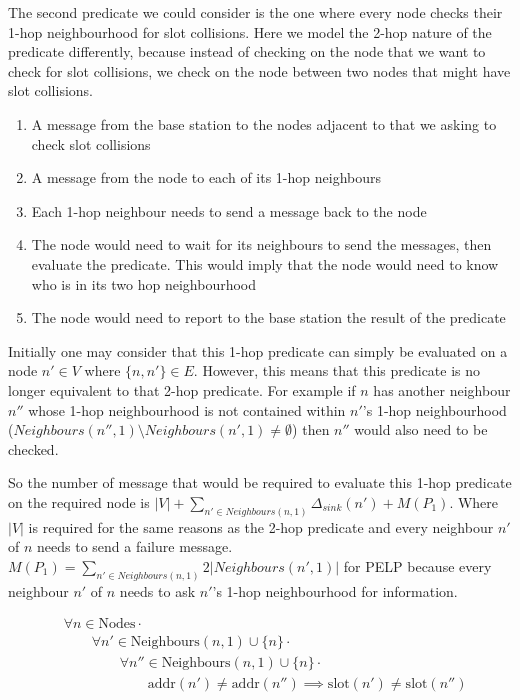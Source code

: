 The second predicate we could consider is the one where every node checks their 1-hop neighbourhood for slot collisions. Here we model the 2-hop nature of the predicate differently, because instead of checking on the node that we want to check for slot collisions, we check on the node between two nodes that might have slot collisions.

\begin{enumerate}
	\item A message from the base station to the nodes adjacent to that we asking to check slot collisions
	\item A message from the node to each of its 1-hop neighbours
	\item Each 1-hop neighbour needs to send a message back to the node
	\item The node would need to wait for its neighbours to send the messages, then evaluate the predicate. This would imply that the node would need to know who is in its two hop neighbourhood
	\item The node would need to report to the base station the result of the predicate
\end{enumerate}

Initially one may consider that this 1-hop predicate can simply be evaluated on a node $n' \in V$ where $\{n, n'\} \in E$. However, this means that this predicate is no longer equivalent to that 2-hop predicate. For example if $n$ has another neighbour $n''$ whose 1-hop neighbourhood is not contained within $n'$'s 1-hop neighbourhood ($Neighbours(n'', 1) \setminus Neighbours(n', 1) \not= \emptyset$) then $n''$ would also need to be checked.

So the number of message that would be required to evaluate this 1-hop predicate on the required node is  $|V| + \sum_{n' \in Neighbours(n, 1)}{\Delta_{sink}(n')} + M(P_{1})$. Where $|V|$ is required for the same reasons as the 2-hop predicate and every neighbour $n'$ of $n$ needs to send a failure message. $M(P_{1}) = \sum_{n' \in Neighbours(n, 1)}{2|Neighbours(n', 1)|}$ for PELP because every neighbour $n'$ of $n$ needs to ask $n'$'s 1-hop neighbourhood for information.


\begin{align}
\label{eq:1-hop-slot-pred}
&				\forall n \in \text{Nodes} \cdot \\
& \hspace{2em}		\forall n' \in \text{Neighbours}(n, 1) \cup \{n\} \cdot \\
& \hspace{4em}			\forall n'' \in \text{Neighbours}(n, 1) \cup \{n\} \cdot \\
& \hspace{6em}				\text{addr}(n') \not= \text{addr}(n'') \implies \text{slot}(n') \neq \text{slot}(n'')
\end{align}

